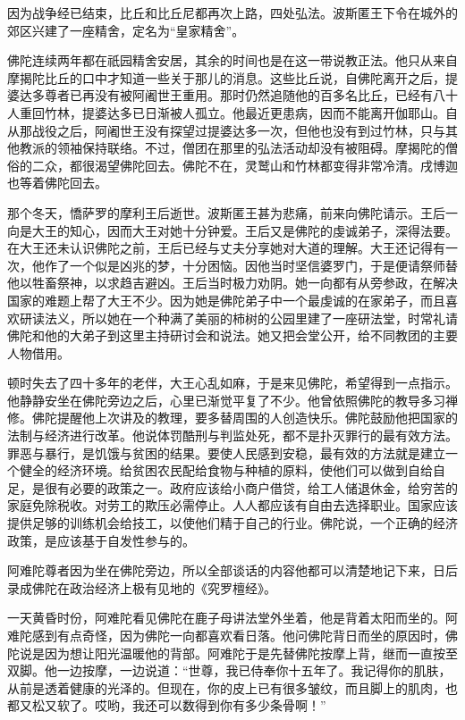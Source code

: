 \documentclass[12pt,twoside,openany]{book}
\begin{document}
因为战争经已结束，比丘和比丘尼都再次上路，四处弘法。波斯匿王下令在城外的郊区兴建了一座精舍，定名为“皇家精舍”。

佛陀连续两年都在祇园精舍安居，其余的时间也是在这一带说教正法。他只从来自摩揭陀比丘的口中才知道一些关于那儿的消息。这些比丘说，自佛陀离开之后，提婆达多尊者已再没有被阿阇世王重用。那时仍然追随他的百多名比丘，已经有八十人重回竹林，提婆达多已日渐被人孤立。他最近更患病，因而不能离开伽耶山。自从那战役之后，阿阇世王没有探望过提婆达多一次，但他也没有到过竹林，只与其他教派的领袖保持联络。不过，僧团在那里的弘法活动却没有被阻碍。摩揭陀的僧俗的二众，都很渴望佛陀回去。佛陀不在，灵鹫山和竹林都变得非常冷清。戌博迦也等着佛陀回去。

那个冬天，憍萨罗的摩利王后逝世。波斯匿王甚为悲痛，前来向佛陀请示。王后一向是大王的知心，因而大王对她十分钟爱。王后又是佛陀的虔诚弟子，深得法要。在大王还未认识佛陀之前，王后已经与丈夫分享她对大道的理解。大王还记得有一次，他作了一个似是凶兆的梦，十分困恼。因他当时坚信婆罗门，于是便请祭师替他以牲畜祭神，以求趋吉避凶。王后当时极力劝阴。她一向都有从旁参政，在解决国家的难题上帮了大王不少。因为她是佛陀弟子中一个最虔诚的在家弟子，而且喜欢研读法义，所以她在一个种满了美丽的柿树的公园里建了一座研法堂，时常礼请佛陀和他的大弟子到这里主持研讨会和说法。她又把会堂公开，给不同教团的主要人物借用。

顿时失去了四十多年的老伴，大王心乱如麻，于是来见佛陀，希望得到一点指示。他静静安坐在佛陀旁边之后，心里已渐觉平复了不少。他曾依照佛陀的教导多习禅修。佛陀提醒他上次讲及的教理，要多替周围的人创造快乐。佛陀鼓励他把国家的法制与经济进行改革。他说体罚酷刑与判监处死，都不是扑灭罪行的最有效方法。罪恶与暴行，是饥饿与贫困的结果。要使人民感到安稳，最有效的方法就是建立一个健全的经济环境。给贫困农民配给食物与种植的原料，使他们可以做到自给自足，是很有必要的政策之一。政府应该给小商户借贷，给工人储退休金，给穷苦的家庭免除税收。对劳工的欺压必需停止。人人都应该有自由去选择职业。国家应该提供足够的训练机会给技工，以使他们精于自己的行业。佛陀说，一个正确的经济政策，是应该基于自发性参与的。

阿难陀尊者因为坐在佛陀旁边，所以全部谈话的内容他都可以清楚地记下来，日后录成佛陀在政治经济上极有见地的《究罗檀经》。

一天黄昏时份，阿难陀看见佛陀在鹿子母讲法堂外坐着，他是背着太阳而坐的。阿难陀感到有点奇怪，因为佛陀一向都喜欢看日落。他问佛陀背日而坐的原因时，佛陀说是因为想让阳光温暖他的背部。阿难陀于是先替佛陀按摩上背，继而一直按至双脚。他一边按摩，一边说道：“世尊，我已侍奉你十五年了。我记得你的肌肤，从前是透着健康的光泽的。但现在，你的皮上已有很多皱纹，而且脚上的肌肉，也都又松又软了。哎哟，我还可以数得到你有多少条骨啊！”
\end{document}
